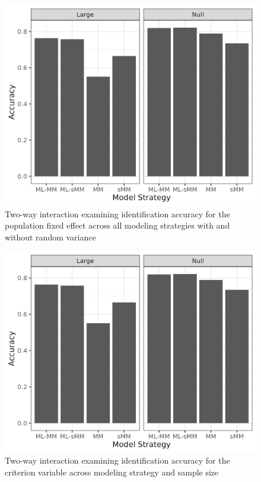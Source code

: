 \documentclass[12pt]{./styles/outhesis}
\begin{document}
\begin{figure}
\centering
\includegraphics{figures/glm1TwoWay1.png}
\caption{Two-way interaction examining identification accuracy for the
population fixed effect across all modeling strategies with and without
random variance}
\end{figure}

\begin{figure}
\centering
\includegraphics{figures/glm1TwoWay2.png}
\caption{Two-way interaction examining identification accuracy for the
criterion variable across modeling strategy and sample size}
\end{figure}
\end{document}
